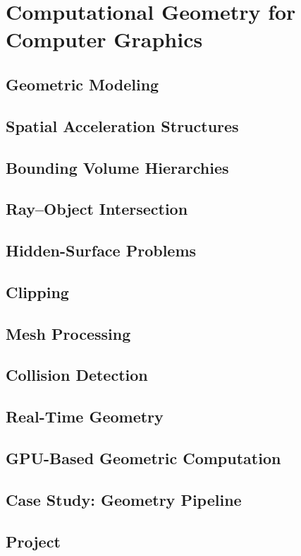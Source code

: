 \chapter{Computational Geometry for Computer Graphics}
\label{ch:applications_graphics}


\section{Geometric Modeling}
\label{sec:graphics_modeling}

\section{Spatial Acceleration Structures}
\label{sec:graphics_acceleration}

\section{Bounding Volume Hierarchies}
\label{sec:graphics_bvh}

\section{Ray--Object Intersection}
\label{sec:graphics_ray_intersection}

\section{Hidden-Surface Problems}
\label{sec:graphics_hidden_surface}

\section{Clipping}
\label{sec:graphics_clipping}

\section{Mesh Processing}
\label{sec:graphics_mesh_processing}

\section{Collision Detection}
\label{sec:graphics_collision}

\section{Real-Time Geometry}
\label{sec:graphics_real_time}

\section{GPU-Based Geometric Computation}
\label{sec:graphics_gpu}

\section{Case Study: Geometry Pipeline}
\label{sec:graphics_case_study}

\section{Project}
\label{sec:graphics_project}
